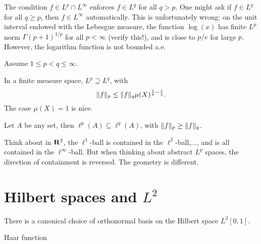 The condition $f \in L^p \cap L^\infty$ enforces $f \in L^q$ for all $q > p$. One might ask if $f \in L^q$ for all $q \geq p$, then $f \in L^\infty$ automatically. This is unfortunately wrong: on the unit interval endowed with the Lebesgue measure, the function $\log(x)$ has finite $L^p$ norm $\Gamma(p+1)^{1/p}$ for all $p < \infty$ (verify this!), and is close to $p/e$ for large $p$. However, the logarithm function is not bounded a.e.

Assume $1\leq p < q \leq \infty$.

\begin{prop}
    In a finite measure space, $L^p \supseteq L^q$, with \[\lVert f \rVert_p \leq \lVert f \rVert_q \mu(X)^{\frac{1}{p} - \frac{1}{q}}.\] The case $\mu(X) = 1$ is nice.
\end{prop}

\begin{prop}
    Let $A$ be any set, then $\ell^p(A) \subseteq \ell^q(A)$, with $\lVert f \rVert_p \geq \lVert f \rVert_q$.
\end{prop}

Think about in $\mathbf{R}^2$, the $\ell^1$-ball is contained in the $\ell^2$-ball,..., and is all contained in the $\ell^\infty$-ball. But when thinking about abstract $L^p$ spaces, the direction of containment is reversed. The geometry is different.

\section{Hilbert spaces and \texorpdfstring{$L^2$}{L2}}

There is a canonical choice of orthonormal basis on the Hilbert space $L^2[0,1]$.

Haar function



